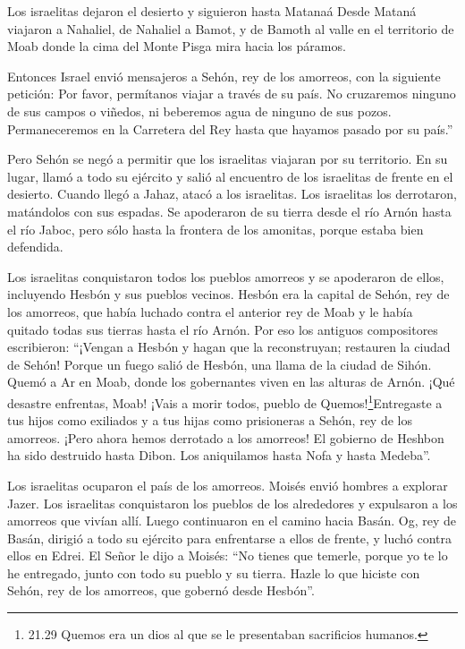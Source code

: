 Los israelitas dejaron el desierto y siguieron hasta Matanaá
 Desde Mataná viajaron a Nahaliel, de Nahaliel a Bamot,
 y de Bamoth al valle en el territorio de Moab donde la
cima del Monte Pisga mira hacia los páramos.

 Entonces Israel envió mensajeros a Sehón, rey de los
amorreos, con la siguiente petición:  Por favor, permítanos
viajar a través de su país. No cruzaremos ninguno de sus campos o
viñedos, ni beberemos agua de ninguno de sus pozos. Permaneceremos en la
Carretera del Rey hasta que hayamos pasado por su país.''

 Pero Sehón se negó a permitir que los israelitas viajaran
por su territorio. En su lugar, llamó a todo su ejército y salió al
encuentro de los israelitas de frente en el desierto. Cuando llegó a
Jahaz, atacó a los israelitas.  Los israelitas los
derrotaron, matándolos con sus espadas. Se apoderaron de su tierra desde
el río Arnón hasta el río Jaboc, pero sólo hasta la frontera de los
amonitas, porque estaba bien defendida.

 Los israelitas conquistaron todos los pueblos amorreos y
se apoderaron de ellos, incluyendo Hesbón y sus pueblos vecinos.
 Hesbón era la capital de Sehón, rey de los amorreos, que
había luchado contra el anterior rey de Moab y le había quitado todas
sus tierras hasta el río Arnón.  Por eso los antiguos
compositores escribieron: ``¡Vengan a Hesbón y hagan que la
reconstruyan; restauren la ciudad de Sehón!  Porque un
fuego salió de Hesbón, una llama de la ciudad de Sihón. Quemó a Ar en
Moab, donde los gobernantes viven en las alturas de Arnón. 
¡Qué desastre enfrentas, Moab! ¡Vais a morir todos, pueblo de
Quemos!\footnote{21.29 Quemos era un dios al que se le presentaban
  sacrificios humanos.}Entregaste a tus hijos como exiliados y a tus
hijas como prisioneras a Sehón, rey de los amorreos.  ¡Pero
ahora hemos derrotado a los amorreos! El gobierno de Heshbon ha sido
destruido hasta Dibon. Los aniquilamos hasta Nofa y hasta Medeba''.

 Los israelitas ocuparon el país de los amorreos.
 Moisés envió hombres a explorar Jazer. Los israelitas
conquistaron los pueblos de los alrededores y expulsaron a los amorreos
que vivían allí.  Luego continuaron en el camino hacia
Basán. Og, rey de Basán, dirigió a todo su ejército para enfrentarse a
ellos de frente, y luchó contra ellos en Edrei.  El Señor
le dijo a Moisés: ``No tienes que temerle, porque yo te lo he entregado,
junto con todo su pueblo y su tierra. Hazle lo que hiciste con Sehón,
rey de los amorreos, que gobernó desde Hesbón''.

